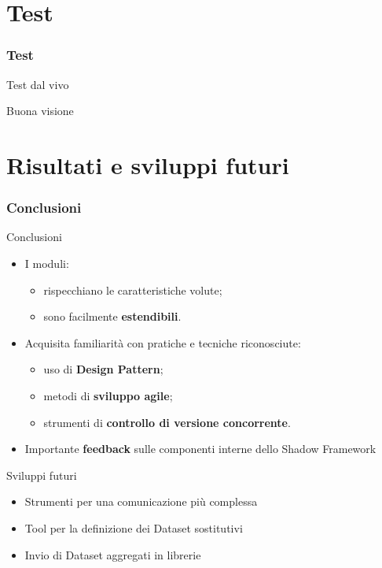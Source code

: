 \documentclass[ignorenonframetext,8pt]{beamer}
\begin{document}
			

	\section{Test}

	\begin{frame}
		\frametitle{Test}
		\begin{block}{Test dal vivo}
			\begin{center}
				Buona visione
			\end{center}
		\end{block}
	\end{frame}

	\section{Risultati e sviluppi futuri}

	\begin{frame}
		\frametitle{Conclusioni}
		\begin{block}{Conclusioni}
			\begin{itemize}
					\item I moduli:
						\begin{itemize}
							\item rispecchiano le caratteristiche volute;
							\item sono facilmente \textbf{estendibili}.
						\end{itemize}
					\item Acquisita familiarit\`a con pratiche e tecniche riconosciute:
						\begin{itemize}
							\item uso di \textbf{Design Pattern};
							\item metodi di \textbf{sviluppo agile};
							\item strumenti di \textbf{controllo di versione concorrente}.
						\end{itemize}
					\item Importante \textbf{feedback} sulle componenti interne dello Shadow Framework
			\end{itemize}
		\end{block}
		\begin{block}{Sviluppi futuri}
			\begin{itemize}
				\item Strumenti per una comunicazione pi\`u complessa
				\item Tool per la definizione dei Dataset sostitutivi
				\item Invio di Dataset aggregati in librerie
			\end{itemize}
		\end{block}
	\end{frame}
\end{document}
